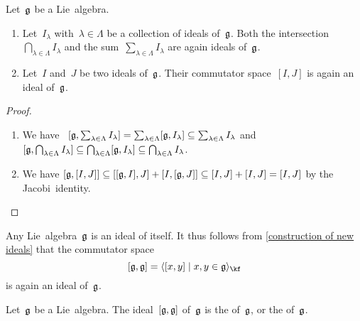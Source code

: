 \begin{proposition}
	\label{construction of new ideals}
	Let~$\mathfrak{g}$ be a Lie~algebra.
	\begin{enumerate}
		\item
		Let~$I_\lambda$ with~$\lambda \in \Lambda$ be a collection of ideals of~$\mathfrak{g}$.
		Both the intersection~$\bigcap_{\lambda \in \Lambda} I_\lambda$ and the sum~$\sum_{\lambda \in \Lambda} I_\lambda$ are again ideals of~$\mathfrak{g}$.
		\item
		Let~$I$ and~$J$ be two ideals of~$\mathfrak{g}$.
		Their commutator space~$[I,J]$ is again an ideal of~$\mathfrak{g}$.
	\end{enumerate}
\end{proposition}


\begin{proof}
	\leavevmode
	\begin{enumerate}
		\item
			We have~%
			$
				[ \mathfrak{g}, \sum_{\lambda \in \Lambda} I_\lambda ]
				=
				\sum_{\lambda \in \Lambda} [ \mathfrak{g}, I_\lambda ]
				\subseteq
				\sum_{\lambda \in \Lambda} I_\lambda
			$
			and~%
			$
				[ \mathfrak{g}, \bigcap_{\lambda \in \Lambda} I_\lambda ]
				\subseteq
				\bigcap_{\lambda \in \Lambda} [ \mathfrak{g}, I_\lambda ]
				\subseteq
				\bigcap_{\lambda \in \Lambda} I_\lambda
			$.
		\item
			We have
			$
				[ \mathfrak{g}, [I, J] ]
				\subseteq
				[ [\mathfrak{g}, I], J] + [ I, [\mathfrak{g}, J]]
				\subseteq
				[I, J] + [I, J]
				=
				[I, J]
			$
			by the Jacobi~identity.
	 \qedhere
 \end{enumerate}
\end{proof}


\begin{example}
	Any Lie~algebra~$\mathfrak{g}$ is an ideal of itself.
	It thus follows from \cref{construction of new ideals} that the commutator space
	\[
		[\glie, \glie]
		=
		\gen{ [x,y] \suchthat x, y \in \glie }_{\kf}
	\]
	is again an ideal of~$\mathfrak{g}$.
\end{example}


\begin{definition}
	Let~$\mathfrak{g}$ be a Lie~algebra.
	The ideal~$[ \mathfrak{g}, \mathfrak{g} ]$ of~$\mathfrak{g}$ is the  of~$\mathfrak{g}$, or the  of~$\mathfrak{g}$.
\end{definition}


